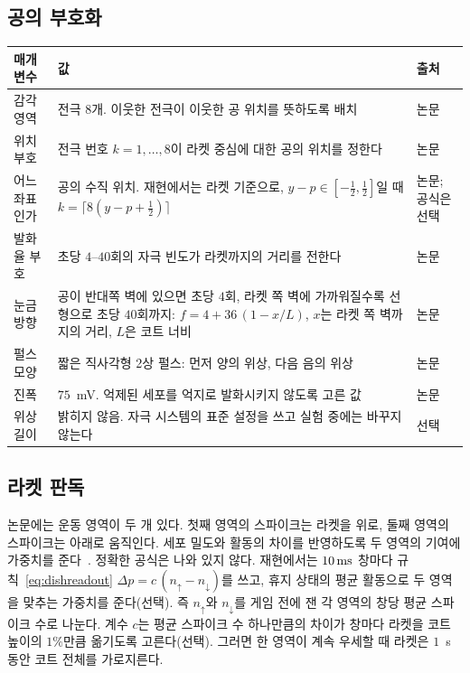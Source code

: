 \subsection*{공의 부호화}

\begin{center}
\footnotesize
\setlength{\tabcolsep}{4pt}
\renewcommand{\arraystretch}{1.15}
\begin{tabular}{>{\raggedright}p{3.4cm}>{\raggedright}p{7.5cm}>{\raggedright\arraybackslash}p{1.6cm}}
\toprule
매개변수 & 값 & 출처 \\
\midrule
감각 영역 & 전극 $8$개. 이웃한 전극이 이웃한 공 위치를 뜻하도록 배치 & 논문 \\
위치 부호 & 전극 번호 $k=1,\dots,8$이 라켓 중심에 대한 공의 위치를 정한다 & 논문 \\
어느 좌표인가 & 공의 수직 위치. 재현에서는 라켓 기준으로, $y-p\in[-\tfrac12,\tfrac12]$일 때 $k=\lceil 8(y-p+\tfrac12)\rceil$ & 논문; 공식은 선택 \\
발화율 부호 & 초당 $4$--$40$회의 자극 빈도가 라켓까지의 거리를 전한다 & 논문 \\
눈금 방향 & 공이 반대쪽 벽에 있으면 초당 $4$회, 라켓 쪽 벽에 가까워질수록 선형으로 초당 $40$회까지: $f=4+36\,(1-x/L)$, $x$는 라켓 쪽 벽까지의 거리, $L$은 코트 너비 & 논문 \\
펄스 모양 & 짧은 직사각형 2상 펄스: 먼저 양의 위상, 다음 음의 위상 & 논문 \\
진폭 & $75$~mV. 억제된 세포를 억지로 발화시키지 않도록 고른 값 & 논문 \\
위상 길이 & 밝히지 않음. 자극 시스템의 표준 설정을 쓰고 실험 중에는 바꾸지 않는다 & 선택 \\
\bottomrule
\end{tabular}
\end{center}

\subsection*{라켓 판독}

논문에는 운동 영역이 두 개 있다. 첫째 영역의 스파이크는 라켓을 위로, 둘째 영역의 스파이크는 아래로 움직인다. 세포 밀도와 활동의 차이를 반영하도록 두 영역의 기여에 가중치를 준다~\cite{Kagan2022}. 정확한 공식은 나와 있지 않다. 재현에서는 $10\,\text{ms}$ 창마다 규칙~\eqref{eq:dishreadout} $\Delta p=c\,(n_\uparrow-n_\downarrow)$를 쓰고, 휴지 상태의 평균 활동으로 두 영역을 맞추는 가중치를 준다(선택). 즉 $n_\uparrow$와 $n_\downarrow$를 게임 전에 잰 각 영역의 창당 평균 스파이크 수로 나눈다. 계수 $c$는 평균 스파이크 수 하나만큼의 차이가 창마다 라켓을 코트 높이의 $1\%$만큼 옮기도록 고른다(선택). 그러면 한 영역이 계속 우세할 때 라켓은 $1$~s 동안 코트 전체를 가로지른다.

